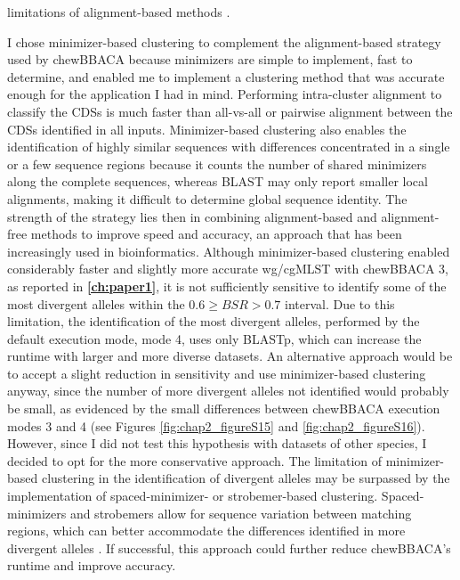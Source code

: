limitations of alignment-based methods \cite{borozan_integrating_2015, zielezinski_alignment-free_2017}.

I chose minimizer-based clustering to complement the alignment-based strategy used by chewBBACA because minimizers are simple to implement, fast to determine, and enabled me to implement a clustering method that was accurate enough for the application I had in mind. Performing intra-cluster alignment to classify the \acp{CDS} is much faster than all-vs-all or pairwise alignment between the \acp{CDS} identified in all inputs. Minimizer-based clustering also enables the identification of highly similar sequences with differences concentrated in a single or a few sequence regions because it counts the number of shared minimizers along the complete sequences, whereas \ac{BLAST} may only report smaller local alignments, making it difficult to determine global sequence identity. The strength of the strategy lies then in combining alignment-based and alignment-free methods to improve speed and accuracy, an approach that has been increasingly used in bioinformatics. Although minimizer-based clustering enabled considerably faster and slightly more accurate \ac{wg/cgMLST} with chewBBACA 3, as reported in \textbf{\autoref{ch:paper1}}, it is not sufficiently sensitive to identify some of the most divergent alleles within the $0.6\geq BSR > 0.7$ interval. Due to this limitation, the identification of the most divergent alleles, performed by the default execution mode, mode 4, uses only \ac{BLASTp}, which can increase the runtime with larger and more diverse datasets. An alternative approach would be to accept a slight reduction in sensitivity and use minimizer-based clustering anyway, since the number of more divergent alleles not identified would probably be small, as evidenced by the small differences between chewBBACA execution modes 3 and 4 (see Figures \ref{fig:chap2_figureS15} and \ref{fig:chap2_figureS16}). However, since I did not test this hypothesis with datasets of other species, I decided to opt for the more conservative approach. The limitation of minimizer-based clustering in the identification of divergent alleles may be surpassed by the implementation of spaced-minimizer- or strobemer-based clustering. Spaced-minimizers and strobemers allow for sequence variation between matching regions, which can better accommodate the differences identified in more divergent alleles \cite{sahlin_effective_2021, karami_designing_2024}. If successful, this approach could further reduce chewBBACA's runtime and improve accuracy.

